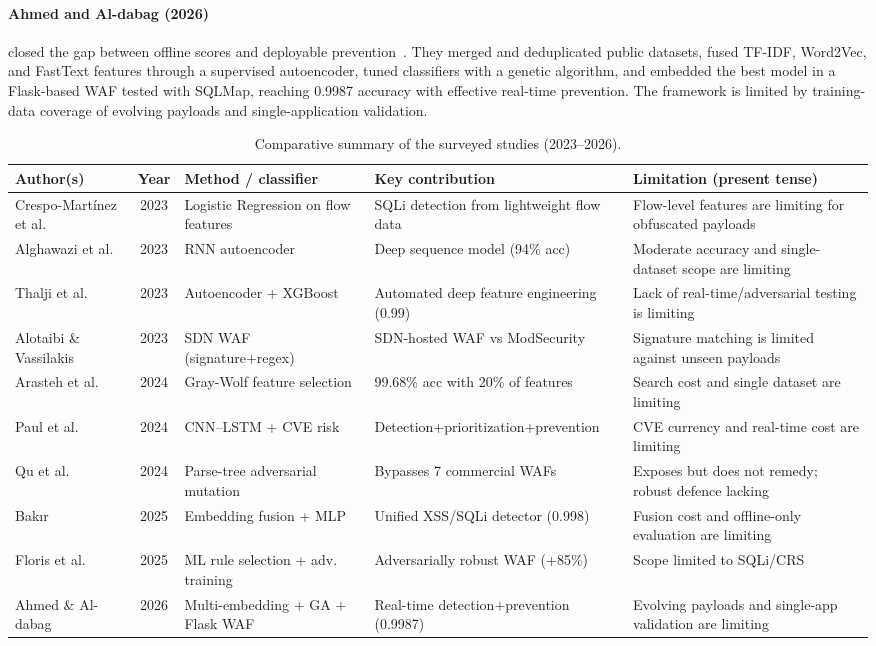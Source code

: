 \documentclass[pdflatex,sn-mathphys-num]{sn-jnl}
\begin{document}
\paragraph{Ahmed and Al-dabag (2026)}
closed the gap between offline scores and deployable prevention~\cite{ahmed2026deployment}.
They merged and deduplicated public datasets, fused TF-IDF, Word2Vec, and FastText
features through a supervised autoencoder, tuned classifiers with a genetic algorithm,
and embedded the best model in a Flask-based WAF tested with SQLMap, reaching 0.9987
accuracy with effective real-time prevention. The framework is limited by training-data
coverage of evolving payloads and single-application validation.

\begin{table}[htbp]
\caption{Comparative summary of the surveyed studies (2023--2026).}\label{tab:compare}
\begin{tabular}{@{}p{2.6cm}cp{2.7cm}p{3.0cm}p{3.4cm}@{}}
\toprule
Author(s) & Year & Method / classifier & Key contribution & Limitation (present tense) \\
\midrule
Crespo-Mart\'inez et al.~\cite{crespo2023sqli} & 2023 & Logistic Regression on flow features & SQLi detection from lightweight flow data & Flow-level features are limiting for obfuscated payloads \\
Alghawazi et al.~\cite{alghawazi2023rnn} & 2023 & RNN autoencoder & Deep sequence model (94\% acc) & Moderate accuracy and single-dataset scope are limiting \\
Thalji et al.~\cite{thalji2023aenet} & 2023 & Autoencoder + XGBoost & Automated deep feature engineering (0.99) & Lack of real-time/adversarial testing is limiting \\
Alotaibi \& Vassilakis~\cite{alotaibi2023sdnwaf} & 2023 & SDN WAF (signature+regex) & SDN-hosted WAF vs ModSecurity & Signature matching is limited against unseen payloads \\
Arasteh et al.~\cite{arasteh2024graywolf} & 2024 & Gray-Wolf feature selection & 99.68\% acc with 20\% of features & Search cost and single dataset are limiting \\
Paul et al.~\cite{paul2024sqlreaper} & 2024 & CNN--LSTM + CVE risk & Detection+prioritization+prevention & CVE currency and real-time cost are limiting \\
Qu et al.~\cite{qu2024advsqli} & 2024 & Parse-tree adversarial mutation & Bypasses 7 commercial WAFs & Exposes but does not remedy; robust defence lacking \\
Bak\i r~\cite{bakir2025uniembed} & 2025 & Embedding fusion + MLP & Unified XSS/SQLi detector (0.998) & Fusion cost and offline-only evaluation are limiting \\
Floris et al.~\cite{floris2025modsec} & 2025 & ML rule selection + adv. training & Adversarially robust WAF (+85\%) & Scope limited to SQLi/CRS \\
Ahmed \& Al-dabag~\cite{ahmed2026deployment} & 2026 & Multi-embedding + GA + Flask WAF & Real-time detection+prevention (0.9987) & Evolving payloads and single-app validation are limiting \\
\bottomrule
\end{tabular}
\end{table}
\end{document}
